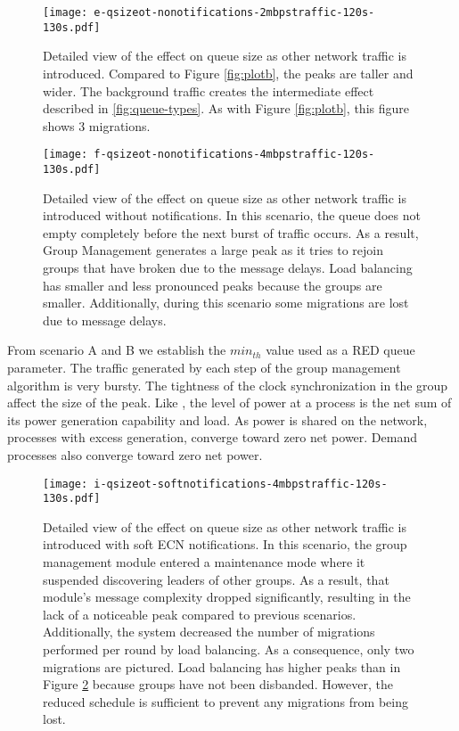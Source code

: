 \begin{figure}
\centering
\texttt{[image: e-qsizeot-nonotifications-2mbpstraffic-120s-130s.pdf]}
\caption[Detailed view of the effect on queue size as other network traffic is introduced.]{
Detailed view of the effect on queue size as other network traffic is introduced.
Compared to Figure \ref{fig:plotb}, the peaks are taller and wider. 
The background traffic creates the intermediate effect described in \ref{fig:queue-types}.
As with Figure \ref{fig:plotb}, this figure shows 3 migrations.}
\label{fig:plote}
\end{figure}

\begin{figure}
\centering
\texttt{[image: f-qsizeot-nonotifications-4mbpstraffic-120s-130s.pdf]}
\caption[Detailed view of the effect on queue size as other network traffic is introduced without notifications.]{
Detailed view of the effect on queue size as other network traffic is introduced without notifications.
In this scenario, the queue does not empty completely before the next burst of traffic occurs.
As a result, Group Management generates a large peak as it tries to rejoin groups that have broken due to the message delays.
Load balancing has smaller and less pronounced peaks because the groups are smaller.
Additionally, during this scenario some migrations are lost due to message delays.}
\label{fig:plotf}
\end{figure}

From scenario A and B we establish the $min_{th}$ value used as a \ac{RED} queue parameter.
The traffic generated by each step of the group management algorithm is very bursty.
The tightness of the clock synchronization in the group affect the size of the peak.
Like \cite{HILTESTBED}, the level of power at a process is the net sum of its power generation capability and load.
As power is shared on the network, processes with excess generation, converge toward zero net power.
Demand processes also converge toward zero net power.

\begin{figure}
\centering
\texttt{[image: i-qsizeot-softnotifications-4mbpstraffic-120s-130s.pdf]}
\caption[Detailed view of the effect on queue size as other network traffic is introduced with soft \ac{ECN} notifications.]{
Detailed view of the effect on queue size as other network traffic is introduced with soft \ac{ECN} notifications.
In this scenario, the group management module entered a maintenance mode where it suspended discovering leaders of other groups.
As a result, that module's message complexity dropped significantly, resulting in the lack of a noticeable peak compared to previous scenarios.
Additionally, the system decreased the number of migrations performed per round by load balancing.
As a consequence, only two migrations are pictured.
Load balancing has higher peaks than in Figure \ref{fig:plotf} because groups have not been disbanded.
However, the reduced schedule is sufficient to prevent any migrations from being lost.
}
\label{fig:ploti}
\end{figure}

